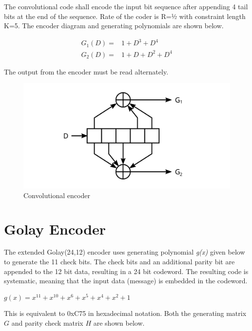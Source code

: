 \documentclass[a4paper,11pt,oneside]{book}
\begin{document}
The convolutional code shall encode the input bit sequence after
appending 4 tail bits at the end of the sequence. Rate of the coder is
R=½ with constraint length K=5. The encoder diagram and generating
polynomials are shown below.

\begin{align*}
	G_1(D) =& 1 + D^3 + D^4 \\
	G_2(D) =& 1+ D + D^2 + D^4
\end{align*}

The output from the encoder must be read alternately.

\begin{figure}[H]
	\centering
	\includegraphics{img/convolutional}
	\caption{Convolutional encoder}
	\label{fig:convolutional}
\end{figure}

\chapter{Golay Encoder}

The extended Golay(24,12) encoder uses generating polynomial \emph{g(x)} given below to generate the 11 check bits. The check bits and an additional parity bit are appended to the 12 bit data, resulting in a 24 bit codeword. The resulting code is systematic, meaning that the input data (message) is embedded in the codeword.

$g(x) = x^{11} + x^{10} + x^6 + x^5 + x^4 + x^2 + 1$

This is equivalent to 0xC75 in hexadecimal notation. Both the generating matrix $G$ and parity check matrix $H$ are shown below.
\end{document}
